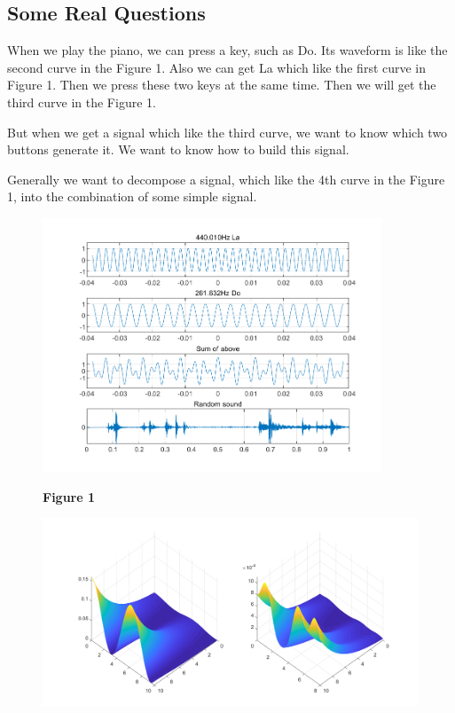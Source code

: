 \documentclass[margin,line]{res}
\begin{document}
\begin{resume}
\subsection{\textbf{Some Real Questions}}
When we play the piano, we can press a key, such as Do. Its waveform is like the second curve in the Figure 1. Also we can get La which like the first curve in Figure 1. Then we press these two keys at the same time. Then we will get the third curve in the Figure 1.\par
But when we get a signal which like the third curve, we want to know which two buttons generate it. We want to know how to build this signal.\par
Generally we want to decompose a signal, which like the 4th curve in the Figure 1, into the combination of some simple signal.\par
\begin{figure}[H]
  \begin{minipage}{0.42\linewidth}
    \centerline{\includegraphics[width=0.9\textwidth]{figure/fig_1.png}}
    \centerline{\textbf{Figure 1}}
  \end{minipage}
  \begin{minipage}{0.55\linewidth}
    \centerline{\includegraphics[width=\textwidth]{figure/fig_2.png}}

\end{minipage}
\end{figure}
\end{resume}
\end{document}
